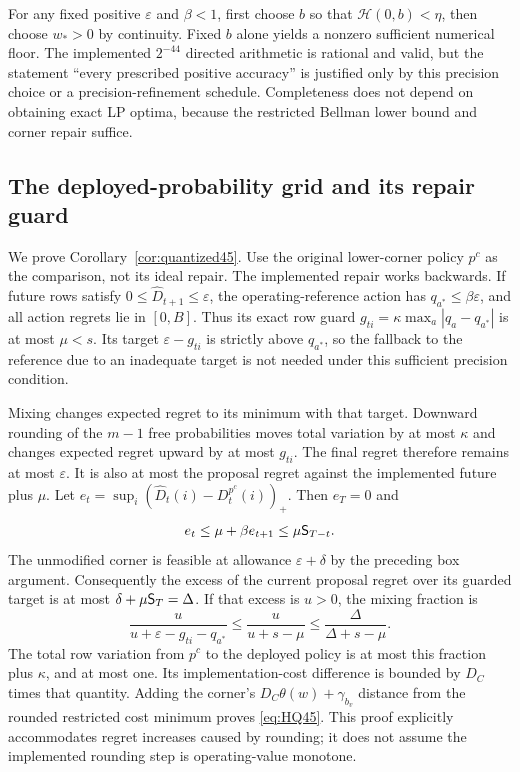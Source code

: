 For any fixed positive $\varepsilon$ and $\beta<1$, first choose $b$ so that $\mathcal H(0,b)<\eta$, then choose $w_*>0$ by continuity. Fixed $b$ alone yields a nonzero sufficient numerical floor. The implemented $2^{-44}$ directed arithmetic is rational and valid, but the statement ``every prescribed positive accuracy'' is justified only by this precision choice or a precision-refinement schedule. Completeness does not depend on obtaining exact LP optima, because the restricted Bellman lower bound and corner repair suffice.


\subsection{The deployed-probability grid and its repair guard}
We prove Corollary~\ref{cor:quantized45}. Use the original lower-corner policy $p^c$ as the comparison, not its ideal repair. The implemented repair works backwards. If future rows satisfy $0\le\widehat D_{t+1}\le\varepsilon$, the operating-reference action has $q_{a^*}\le\beta\varepsilon$, and all action regrets lie in $[0,B]$. Thus its exact row guard
$g_{ti}=\kappa\max_a|q_a-q_{a^*}|$ is at most $\mu<s$. Its target $\varepsilon-g_{ti}$ is strictly above $q_{a^*}$, so the fallback to the reference due to an inadequate target is not needed under this sufficient precision condition.

Mixing changes expected regret to its minimum with that target. Downward rounding of the $m-1$ free probabilities moves total variation by at most $\kappa$ and changes expected regret upward by at most $g_{ti}$. The final regret therefore remains at most $\varepsilon$. It is also at most the proposal regret against the implemented future plus $\mu$. Let
$e_t=\sup_i(\widehat D_t(i)-D_t^{p^c}(i))_+$. Then $e_T=0$ and
\[
 e_t\le\mu+\beta e_{t+1}\le\mu\mathsf S_{T-t}.
\]
The unmodified corner is feasible at allowance $\varepsilon+\delta$ by the preceding box argument. Consequently the excess of the current proposal regret over its guarded target is at most $\delta+\mu\mathsf S_{T}=\Delta$. If that excess is $u>0$, the mixing fraction is
\[
 \frac{u}{u+\varepsilon-g_{ti}-q_{a^*}}
 \le\frac{u}{u+s-\mu}\le\frac{\Delta}{\Delta+s-\mu}.
\]
The total row variation from $p^c$ to the deployed policy is at most this fraction plus $\kappa$, and at most one. Its implementation-cost difference is bounded by $D_C$ times that quantity. Adding the corner's $D_C\theta(w)+\gamma_{b_v}$ distance from the rounded restricted cost minimum proves \eqref{eq:HQ45}. This proof explicitly accommodates regret increases caused by rounding; it does not assume the implemented rounding step is operating-value monotone.

